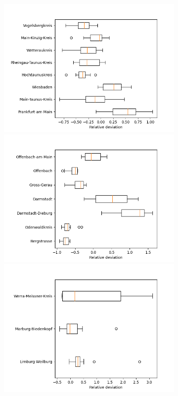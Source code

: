 \begin{figure}
\begin{subfigure}[b]{0.32\textwidth}
		\includegraphics[width=\textwidth]{./figures/50d/deviation_box50_2.png}	
		\includegraphics[width=\textwidth]{./figures/50d/deviation_box50_3.png}	
		\includegraphics[width=\textwidth]{./figures/50d/deviation_box50_4.png}	

\end{subfigure}
\end{figure}
